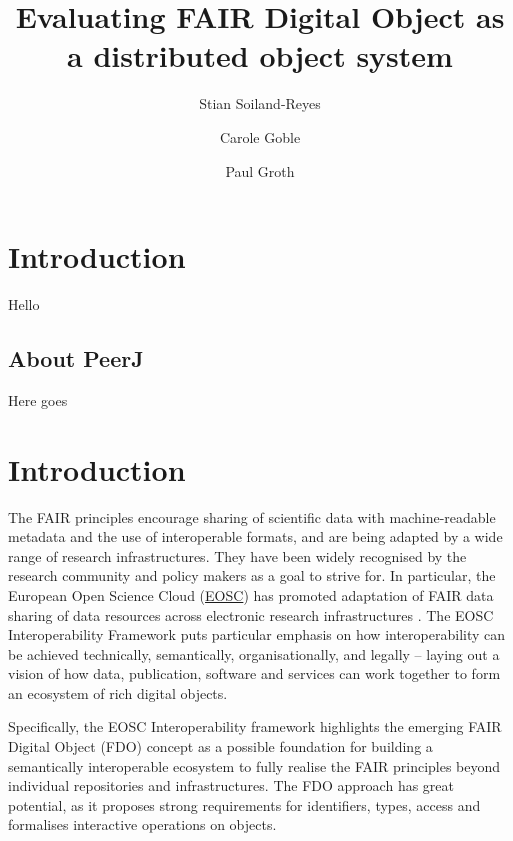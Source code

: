 \documentclass[fleqn,10pt,lineno]{wlpeerjlua}
\title{Evaluating FAIR Digital Object as a distributed object system}
\author[1,2]{Stian Soiland-Reyes}
\author[1]{Carole Goble}
\author[2]{Paul Groth}
\affil[1]{Department of Computer Science, The University of Manchester, UK}
\affil[2]{Informatics Institute, Faculty of Science, University of Amsterdam, NL }
\begin{document}
\flushbottom
\maketitle
\thispagestyle{empty}

\section*{Introduction}
Hello


\subsection*{About PeerJ}


Here goes

\hypertarget{sec:introduction}{%
\section*{Introduction}\label{sec:introduction}}

The FAIR principles \autocite{wilkinsonFAIRGuidingPrinciples2016e} encourage sharing of scientific data with machine-readable metadata and the use of interoperable formats, and are being adapted by a wide range of research infrastructures. They have been widely recognised by the research community and policy makers as a goal to strive for. In particular, the European Open Science Cloud (\href{https://www.eosc.eu/}{EOSC}) has promoted adaptation of FAIR data sharing of data resources across electronic research infrastructures \autocite{monsCloudyIncreasinglyFAIR2017b}. The EOSC Interoperability Framework \autocite{corchoEOSCInteroperabilityFramework2021b} puts particular emphasis on how interoperability can be achieved technically, semantically, organisationally, and legally -- laying out a vision of how data, publication, software and services can work together to form an ecosystem of rich digital objects.

Specifically, the EOSC Interoperability framework highlights the emerging FAIR Digital Object \autocite{schultesFAIRPrinciplesDigital2019a} (FDO) concept as a possible foundation for building a semantically interoperable ecosystem to fully realise the FAIR principles beyond individual repositories and infrastructures. The FDO approach has great potential, as it proposes strong requirements for identifiers, types, access and formalises interactive operations on objects.
\end{document}

